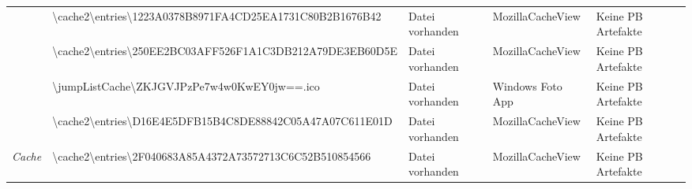 \begin{appendices}
{\begin{landscape}
\begin{table}[h!]
{\begin{tabular}{cllll}
							\multicolumn{1}{|c|}{}                                                                                       & \multicolumn{1}{l|}{\cellcolor[HTML]{34CDF9}\textbackslash{}cache2\textbackslash{}entries\textbackslash{}1223A0378B8971FA4CD25EA1731C80B2B1676B42}                                                                  & \multicolumn{1}{l|}{\cellcolor[HTML]{009901}Datei vorhanden}                                      & \multicolumn{1}{l|}{MozillaCacheView}            & \multicolumn{1}{l|}{\cellcolor[HTML]{F8A102}Keine PB Artefakte} \\ \cline{2-5} 
							\multicolumn{1}{|c|}{}                                                                                       & \multicolumn{1}{l|}{\cellcolor[HTML]{34CDF9}\textbackslash{}cache2\textbackslash{}entries\textbackslash{}250EE2BC03AFF526F1A1C3DB212A79DE3EB60D5E}                                                                  & \multicolumn{1}{l|}{\cellcolor[HTML]{009901}Datei vorhanden}                                      & \multicolumn{1}{l|}{MozillaCacheView}            & \multicolumn{1}{l|}{\cellcolor[HTML]{F8A102}Keine PB Artefakte} \\ \cline{2-5} 
							\multicolumn{1}{|c|}{}                                                                                       & \multicolumn{1}{l|}{\cellcolor[HTML]{34CDF9}\textbackslash{}jumpListCache\textbackslash{}ZKJGVJPzPe7w4w0KwEY0jw==.ico}                                                                                              & \multicolumn{1}{l|}{\cellcolor[HTML]{009901}Datei vorhanden}                                      & \multicolumn{1}{l|}{Windows Foto App}            & \multicolumn{1}{l|}{\cellcolor[HTML]{F8A102}Keine PB Artefakte} \\ \cline{2-5} 
							\multicolumn{1}{|c|}{}                                                                                       & \multicolumn{1}{l|}{\cellcolor[HTML]{34CDF9}\textbackslash{}cache2\textbackslash{}entries\textbackslash{}D16E4E5DFB15B4C8DE88842C05A47A07C611E01D}                                                                  & \multicolumn{1}{l|}{\cellcolor[HTML]{009901}Datei vorhanden}                                      & \multicolumn{1}{l|}{MozillaCacheView}            & \multicolumn{1}{l|}{\cellcolor[HTML]{F8A102}Keine PB Artefakte} \\ \cline{2-5} 
							\multicolumn{1}{|c|}{\multirow{-6}{*}{\textit{Cache}}}                                                       & \multicolumn{1}{l|}{\cellcolor[HTML]{34CDF9}\textbackslash{}cache2\textbackslash{}entries\textbackslash{}2F040683A85A4372A73572713C6C52B510854566}                                                                  & \multicolumn{1}{l|}{\cellcolor[HTML]{009901}Datei vorhanden}                                      & \multicolumn{1}{l|}{MozillaCacheView}            & \multicolumn{1}{l|}{\cellcolor[HTML]{F8A102}Keine PB Artefakte} \\ \hline

\end{tabular}}
\end{table}
\end{landscape}}
\end{appendices}
